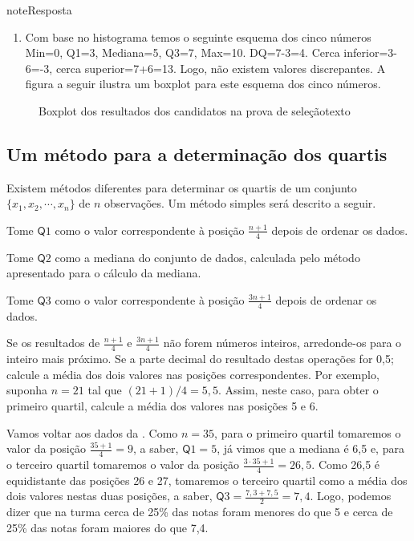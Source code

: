 \begin{sphinxadmonition}{note}{Resposta}
\begin{enumerate}
\item {} 
Com base no histograma temos o seguinte esquema dos cinco números Min=0, Q1=3, Mediana=5, Q3=7, Max=10. DQ=7-3=4. Cerca inferior=3-6=-3, cerca superior=7+6=13. Logo, não existem valores discrepantes. A figura a seguir ilustra um boxplot para este esquema dos cinco números.

\end{enumerate}

\begin{figure}[H]
\centering
\capstart

\noindent{}
\caption{Boxplot dos resultados dos candidatos na prova de seleçãotexto}\label{\detokenize{PE104-A:fig-coloque-aqui-o-nome}}\label{\detokenize{PE104-A:id1}}\end{figure}
\end{sphinxadmonition}

\subsection{Um método para a determinação dos quartis}

Existem métodos diferentes para determinar os quartis de um conjunto \(\{x_1,x_2,\cdots,x_n\}\) de \(n\) observações. Um método simples será descrito a seguir.

Tome \(\textsf{Q}1\) como o valor correspondente à posição \(\frac{n+1}{4}\) depois de ordenar os dados.

Tome \(\textsf{Q}2\) como a mediana do conjunto de dados, calculada pelo método apresentado para o cálculo da mediana.

Tome \(\textsf{Q}3\) como o valor correspondente à posição \(\frac{3n+1}{4}\) depois de ordenar os dados.

Se os resultados de  \(\frac{n+1}{4}\) e \(\frac{3n+1}{4}\) não forem números inteiros, arredonde-os para o inteiro mais próximo. Se a parte decimal do resultado destas operações for 0,5; calcule a média dos dois valores nas posições correspondentes. Por exemplo, suponha \(n=21\) tal que \((21+1)/4=5,5\). Assim, neste caso, para obter o primeiro quartil, calcule a média dos valores nas posições 5 e 6.

Vamos voltar aos dados da . Como \(n=35\), para o primeiro quartil tomaremos o valor da posição \(\frac{35+1}{4}=9\), a saber, \(\textsf{Q}1=5\), já vimos que a mediana é 6,5 e, para o terceiro quartil tomaremos o valor da posição \(\frac{3\cdot 35+1}{4}=26,5\). Como 26,5 é equidistante das posições 26 e 27, tomaremos o terceiro quartil como a média dos dois valores nestas duas posições, a saber, \(\textsf{Q}3=\frac{7,3+7,5}{2}=7,4\). Logo, podemos dizer que na turma cerca de 25\% das notas foram menores do que 5 e cerca de 25\% das notas foram maiores do que 7,4.

